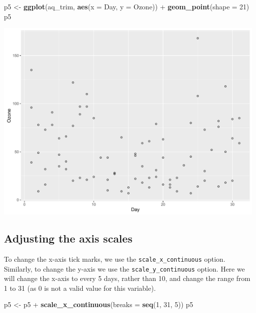 \documentclass[]{article}
\newenvironment{Shaded}{\begin{snugshade}}{\end{snugshade}}
\newcommand{\KeywordTok}[1]{\textcolor[rgb]{0.13,0.29,0.53}{\textbf{{#1}}}}
\newcommand{\DataTypeTok}[1]{\textcolor[rgb]{0.13,0.29,0.53}{{#1}}}
\newcommand{\DecValTok}[1]{\textcolor[rgb]{0.00,0.00,0.81}{{#1}}}
\newcommand{\StringTok}[1]{\textcolor[rgb]{0.31,0.60,0.02}{{#1}}}
\newcommand{\NormalTok}[1]{{#1}}
\begin{document}
\begin{Shaded}
\begin{Highlighting}[]
\NormalTok{p5 <-}\StringTok{ }\KeywordTok{ggplot}\NormalTok{(aq_trim, }\KeywordTok{aes}\NormalTok{(}\DataTypeTok{x =} \NormalTok{Day, }\DataTypeTok{y =} \NormalTok{Ozone)) +}\StringTok{ }\KeywordTok{geom_point}\NormalTok{(}\DataTypeTok{shape =} \DecValTok{21}\NormalTok{)}
\NormalTok{p5}
\end{Highlighting}
\end{Shaded}

\begin{center}\includegraphics{0_all_posts_pdf/scatter_2-1} \end{center}

\subsection{Adjusting the axis scales}\label{adjusting-the-axis-scales}

To change the x-axis tick marks, we use the
\texttt{scale\_x\_continuous} option. Similarly, to change the y-axis we
use the \texttt{scale\_y\_continuous} option. Here we will change the
x-axis to every 5 days, rather than 10, and change the range from 1 to
31 (as 0 is not a valid value for this variable).

\begin{Shaded}
\begin{Highlighting}[]
\NormalTok{p5 <-}\StringTok{ }\NormalTok{p5 +}\StringTok{ }\KeywordTok{scale_x_continuous}\NormalTok{(}\DataTypeTok{breaks =} \KeywordTok{seq}\NormalTok{(}\DecValTok{1}\NormalTok{, }\DecValTok{31}\NormalTok{, }\DecValTok{5}\NormalTok{))}
\NormalTok{p5}
\end{Highlighting}
\end{Shaded}
\end{document}
